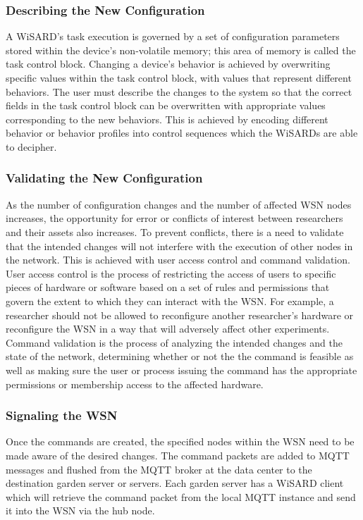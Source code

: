 \subsubsection{Describing the New Configuration}
A WiSARD's task execution is governed by a set of configuration parameters stored within the device's non-volatile memory; this area of memory is called the task control block. Changing a device's behavior is achieved by overwriting specific values within the task control block, with values that represent different behaviors. The user must describe the changes to the system so that the correct fields in the task control block can be overwritten with appropriate values corresponding to the new behaviors. This is achieved by encoding different behavior or behavior profiles into control sequences which the WiSARDs are able to decipher. 

\subsubsection{Validating the New Configuration}
As the number of configuration changes and the number of affected WSN nodes increases, the opportunity for error or conflicts of interest between researchers and their assets also increases. To prevent conflicts, there is a need to validate that the intended changes will not interfere with the execution of other nodes in the network. This is achieved with user access control and command validation. User access control is the process of restricting the access of users to specific pieces of hardware or software based on a set of rules and permissions that govern the extent to which they can interact with the WSN. For example, a researcher should not be allowed to reconfigure another researcher's hardware or reconfigure the WSN in a way that will adversely affect other experiments. Command validation is the process of analyzing the intended changes and the state of the network, determining whether or not the the command is feasible as well as making sure the user  or process issuing the command has the appropriate permissions or membership access to the affected hardware.

\subsubsection{Signaling the WSN}
Once the commands are created, the specified nodes within the WSN need to be made aware of the desired changes. The command packets are added to MQTT messages and flushed from the MQTT broker at the data center to the destination garden server or servers. Each garden server has a WiSARD client which will retrieve the command packet from the local MQTT instance and send it into the WSN via the hub node. 

